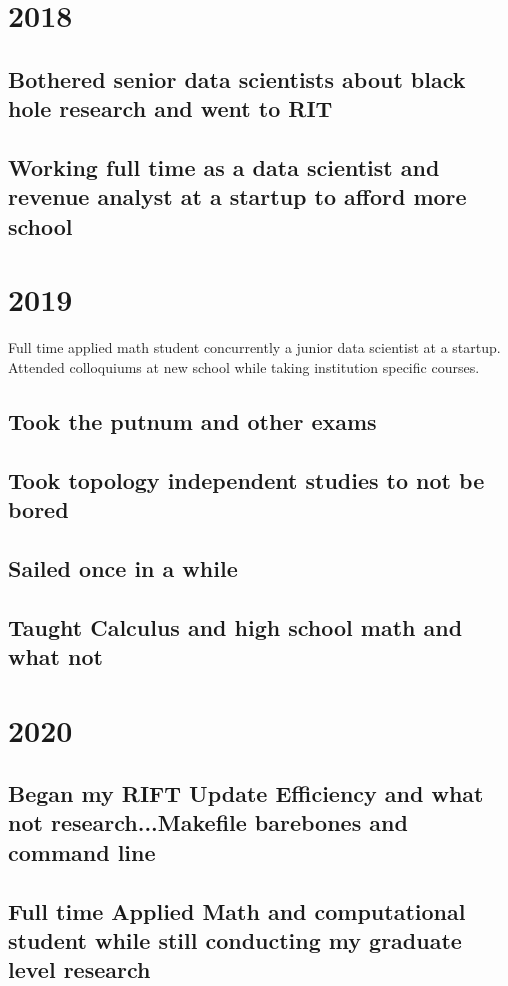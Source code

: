 \documentclass{article}
\begin{document}
\section{2018}
\subsection{Bothered senior data scientists about black hole research and went to RIT}
\subsection{Working full time as a data scientist and revenue analyst at a startup to afford more school}

\section{2019}
Full time applied math student concurrently a junior data scientist at a startup. Attended colloquiums at new school while taking institution specific courses.
\subsection{Took the putnum and other exams}
\subsection{Took topology independent studies to not be bored}
\subsection{Sailed once in a while}
\subsection{Taught Calculus and high school math and what not}
\section{2020}
\subsection{Began my RIFT Update Efficiency and what not research...Makefile barebones and command line}
\subsection{Full time Applied Math and computational student while still conducting my graduate level research}
\end{document}
